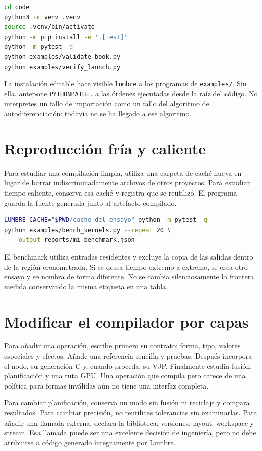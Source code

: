 \documentclass[12pt,a4paper,oneside]{report}
\begin{document}
\begin{lstlisting}[language=bash]
cd code
python3 -m venv .venv
source .venv/bin/activate
python -m pip install -e '.[test]'
python -m pytest -q
python examples/validate_book.py
python examples/verify_launch.py
\end{lstlisting}

La instalación editable hace visible \texttt{lumbre} a los programas de \texttt{examples/}. Sin ella, antepone \texttt{PYTHONPATH=.} a las órdenes ejecutadas desde la raíz del código. No interpretes un fallo de importación como un fallo del algoritmo de autodiferenciación: todavía no se ha llegado a ese algoritmo.

\section{Reproducción fría y caliente}
Para estudiar una compilación limpia, utiliza una carpeta de caché nueva en lugar de borrar indiscriminadamente archivos de otros proyectos. Para estudiar tiempo caliente, conserva esa caché y registra que se reutilizó. El programa guarda la fuente generada junto al artefacto compilado.

\begin{lstlisting}[language=bash]
LUMBRE_CACHE="$PWD/cache_del_ensayo" python -m pytest -q
python examples/bench_kernels.py --repeat 20 \
  --output reports/mi_benchmark.json
\end{lstlisting}

El benchmark utiliza entradas residentes y excluye la copia de las salidas dentro de la región cronometrada. Si se desea tiempo extremo a extremo, se crea otro ensayo y se nombra de forma diferente. No se cambia silenciosamente la frontera medida conservando la misma etiqueta en una tabla.

\section{Modificar el compilador por capas}
Para añadir una operación, escribe primero su contrato: forma, tipo, valores especiales y efectos. Añade una referencia sencilla y pruebas. Después incorpora el nodo, su generación C y, cuando proceda, su VJP. Finalmente estudia fusión, planificación y una ruta GPU. Una operación que compila pero carece de una política para formas inválidas aún no tiene una interfaz completa.

Para cambiar planificación, conserva un modo sin fusión ni reciclaje y compara resultados. Para cambiar precisión, no reutilices tolerancias sin examinarlas. Para añadir una llamada externa, declara la biblioteca, versiones, layout, workspace y stream. Esa llamada puede ser una excelente decisión de ingeniería, pero no debe atribuirse a código generado íntegramente por Lumbre.
\end{document}
